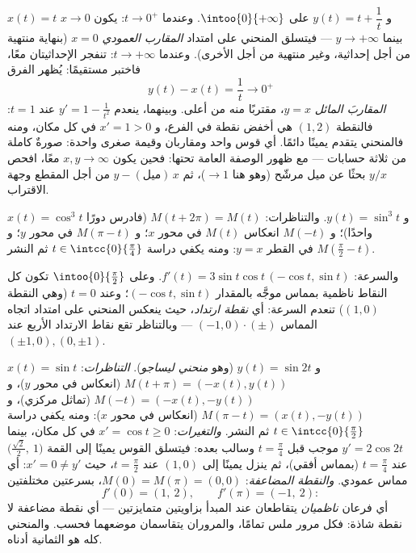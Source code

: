 \begin{example}
\label{ex:b1:curves:asymptotes}
$x(t) = t$ و $y(t) = t + \dfrac1t$ على $\intoo{0}{+\infty}$. وعندما $t
\to 0^{+}$: يكون $x \to 0$ بينما $y \to +\infty$ --- فيتسلق المنحني
على امتداد \emph{المقارب العمودي} $x = 0$ (بنهاية منتهية من أجل
إحداثية، وغير منتهية من أجل الأخرى). وعندما $t \to +\infty$:
تنفجر الإحداثيتان معًا، فاختبر مستقيمًا: يُظهر الفرق
\[
y(t) - x(t) = \frac1t \longrightarrow 0^{+}
\]
\emph{المقاربَ المائل} $y = x$، مقتربًا منه من
أعلى. وبينهما، ينعدم $y' = 1 - \frac1{t^2}$ عند $t = 1$:
فالنقطة $(1, 2)$ هي أخفض نقطة في الفرع، و $x' = 1 >
0$ في كل مكان، ومنه فالمنحني يتقدم يمينًا دائمًا. أي قوس واحد
ومقاربان وقيمة صغرى واحدة: صورةٌ كاملة من ثلاثة
حسابات --- مع ظهور الوصفة العامة تحتها:
فحين يكون $x, y \to \infty$ معًا، افحص $y/x$ بحثًا عن ميل
مرشّح (وهو هنا $\to 1$)، ثم $y - (\text{ميل})\,x$ من أجل
المقطع وجهة الاقتراب.
\end{example}

\begin{example}[النجمية]\label{ex:b1:curves:astroid}
$x(t) = \cos^3 t$ و $y(t) = \sin^3 t$. والتناظرات:
$M(t + 2\pi) = M(t)$ (فادرس دورًا واحدًا)؛ و $M(-t)$ انعكاس
$M(t)$ في محور $x$؛ و $M(\pi - t)$ في محور $y$؛ و $M(\frac\pi2 -
t)$ في القطر $y = x$: ومنه يكفي دراسة $t \in
\intcc{0}{\frac\pi4}$ ثم النشر.

والسرعة: $f'(t) = 3\sin t\cos t\,(-\cos t, \sin t)$. وعلى
$\intoo{0}{\frac\pi2}$ تكون كل النقاط ناظمية بمماس موجَّه
بالمقدار $(-\cos t, \sin t)$؛ وعند $t = 0$ (وهي النقطة $(1,0)$) تنعدم
السرعة: أي \emph{نقطة ارتداد}، حيث ينعكس المنحني على امتداد
اتجاه المماس $(-1, 0)\cdot(\pm)$ --- وبالتناظر تقع نقاط
الارتداد الأربع عند $(\pm1, 0), (0, \pm1)$.
\end{example}

\begin{example}
\label{ex:b1:curves:lissajous}
$x(t) = \sin t$ و $y(t) = \sin 2t$ (وهو \emph{منحني ليساجو}).
\emph{التناظرات}: $M(t + \pi) = (-x(t), y(t))$ (انعكاس في
محور $y$)، و $M(-t) = (-x(t), -y(t))$ (تماثل مركزي)،
و $M(\pi - t) = (x(t), -y(t))$ (انعكاس في محور $x$): ومنه
يكفي دراسة $t \in \intcc{0}{\frac\pi2}$ ثم النشر.
\emph{والتغيرات}: $x' = \cos t \geq 0$ في كل مكان، بينما $y' =
2\cos 2t$ موجب قبل $t = \frac\pi4$ وسالب بعده:
فيتسلق القوس يمينًا إلى القمة
$\bigl(\frac{\sqrt2}2,\ 1\bigr)$ عند $t = \frac\pi4$ (بمماس
أفقي)، ثم ينزل يمينًا إلى $(1, 0)$ عند $t =
\frac\pi2$، حيث $x' = 0 \neq y'$: أي مماس عمودي.
\emph{والنقطة المضاعفة}: $M(0) = M(\pi) = (0,0)$، بسرعتين مختلفتين
\[
f'(0) = (1,\ 2), \qquad f'(\pi) = (-1,\ 2) :
\]
أي فرعان \emph{ناظميان} يتقاطعان عند المبدأ بزاويتين
متمايزتين --- أي نقطة مضاعفة لا نقطة شاذة: فكل مرور
ملس تمامًا، والمروران يتقاسمان موضعهما فحسب.
والمنحني كله هو الثمانية أدناه.
\end{example}


